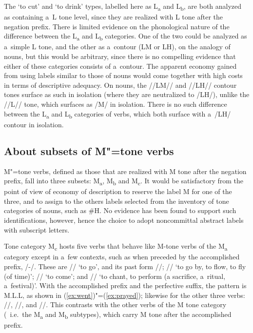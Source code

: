  The ‘to cut’ and ‘to drink’ types, labelled here as L\textsubscript{a} and L\textsubscript{b}, are both analyzed as containing a~L tone level,
 since they are realized with L tone after the {negation} prefix. There is limited evidence on the
 phonological nature of the difference between the L\textsubscript{a} and L\textsubscript{b} categories. One of the two could be analyzed as a~simple L tone, and the other as a~contour (LM or LH), on the {analogy} of nouns, but this would be
 arbitrary, since there is no compelling evidence that either of these categories consists of
 a~contour. The apparent economy gained from using labels similar to those of nouns would come
 together with high costs in terms of descriptive adequacy. On nouns, the \mbox{//LM//} and \mbox{//LH//} contour tones surface as such in isolation (where they are neutralized to /LH/), unlike the //L// tone, which surfaces
 as /M/ in isolation. There is no such difference between the L\textsubscript{a} and L\textsubscript{b} categories of verbs, which
 both surface with a~/LH/ contour in isolation.


\subsection{About subsets of M"=tone verbs}
\label{sec:tonemcasubsetoffiveintransitiveverbswithinthemtonecategory}

M"=tone verbs, defined as those that are realized with M tone after the {negation} prefix, fall into three subsets: M\textsubscript{a}, M\textsubscript{b} and M\textsubscript{c}. It would be satisfactory from the point of view of economy of description to reserve the label M for one of the three, and to assign to the others labels selected from the inventory of tone categories of nouns, such as \#H. No evidence has
been found to support such identifications, however, hence the choice to adopt noncommittal abstract labels with subscript letters.

Tone category M\textsubscript{c} hosts five verbs that behave
like M-tone verbs of the M\textsubscript{a} category except in a~few contexts, such as when preceded by the {accomplished} prefix, /-/. These
are // ‘to go’, and its past form //; // ‘to go by, to flow, to fly (of
time)’; // ‘to come’; and // ‘to chant, to perform (a sacrifice, a~ritual,
a~festival)’. With the {accomplished} prefix and the {perfective} suffix, the pattern
is M.L.L, as shown in (\ref{ex:went})"=(\ref{ex:prayed}); likewise for the other three verbs: //, //, and //. This contrasts with the other verbs of the M tone category (~i.e.\ the M\textsubscript{a} and M\textsubscript{b} subtypes), which carry M tone after the
{accomplished} prefix. 

